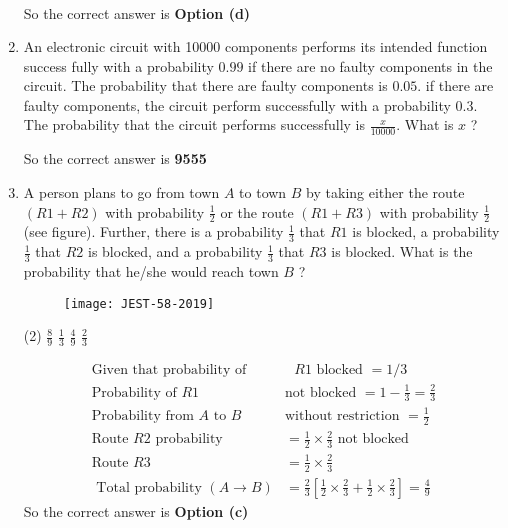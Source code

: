 \begin{enumerate}
\begin{answer}
\begin{align*}
	\end{align*}
		So the correct answer is \textbf{Option (d)}
\end{answer}
\item An electronic circuit with 10000 components performs its intended function success fully with a probability $0.99$ if there are no faulty components in the circuit. The probability that there are faulty components is $0.05$. if there are faulty components, the circuit perform successfully with a probability $0.3$. The probability that the circuit performs successfully is $\frac{x}{10000}$. What is $x$ ?
{}
\begin{answer}
So the correct answer is  \textbf{9555}
\end{answer}
\item A person plans to go from town $A$ to town $B$ by taking either the route $(R 1+R 2)$ with probability $\frac{1}{2}$ or the route $(R 1+R 3)$ with probability $\frac{1}{2}$ (see figure). Further, there is a probability $\frac{1}{3}$ that $R 1$ is blocked, a probability $\frac{1}{3}$ that $R 2$ is blocked, and a probability $\frac{1}{3}$ that $R 3$ is blocked. What is the probability that he/she would reach town $B$ ?
{}
\begin{figure}[H]
	\centering
	\texttt{[image: JEST-58-2019]}
\end{figure}
 \begin{tasks}(2)
	\task[\textbf{a.}]$\frac{8}{9}$
	\task[\textbf{b.}]$\frac{1}{3}$
	\task[\textbf{c.}]$\frac{4}{9}$
	\task[\textbf{d.}]$\frac{2}{3}$
\end{tasks}
\begin{answer}
	\begin{align*}
	\text{Given that probability of}&\text{ $R 1$ blocked }=1 / 3\\
	\text{Probability of $R 1$ }&\text{not blocked }=1-\frac{1}{3}=\frac{2}{3}\\
	\text{Probability from $A$ to $B$ }&\text{without restriction }=\frac{1}{2}\\
	\text{Route $R 2$ probability }&=\frac{1}{2} \times \frac{2}{3}\text{ not blocked}\\
	\text{Route }R 3&=\frac{1}{2} \times \frac{2}{3}\\
\text{	Total probability }(A \rightarrow B)&=\frac{2}{3}\left[\frac{1}{2} \times \frac{2}{3}+\frac{1}{2} \times \frac{2}{3}\right]=\frac{4}{9}
	\end{align*}
	So the correct answer is \textbf{Option (c)}
\end{answer}

\end{enumerate}